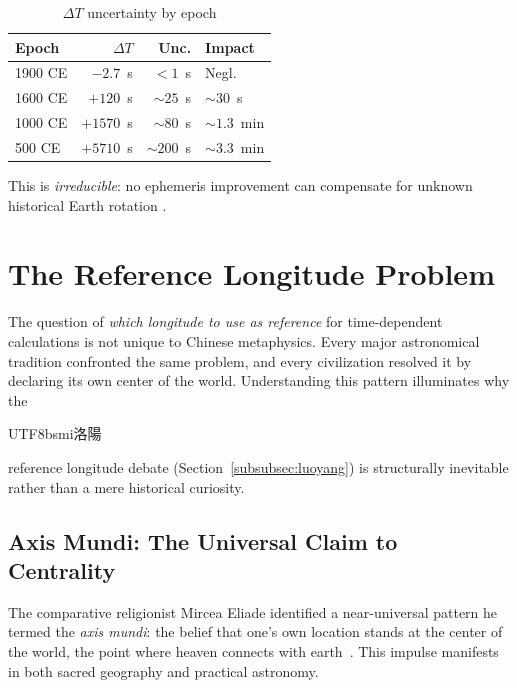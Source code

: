 \documentclass[10pt,a4paper]{article}
\newcommand{\zh}[1]{\begin{CJK}{UTF8}{bsmi}#1\end{CJK}}
\begin{document}
\begin{table}[H]
\centering
\caption{$\Delta T$ uncertainty by epoch}
\label{tab:deltaT}
\footnotesize
\begin{tabular}{lrrl}
\toprule
\textbf{Epoch} & $\Delta T$ & \textbf{Unc.} & \textbf{Impact} \\
\midrule
1900 CE & $-2.7$~s & $<1$~s & Negl. \\
1600 CE & $+120$~s & $\sim 25$~s & $\sim 30$~s \\
1000 CE & $+1570$~s & $\sim 80$~s & $\sim 1.3$~min \\
500 CE & $+5710$~s & $\sim 200$~s & $\sim 3.3$~min \\
\bottomrule
\end{tabular}
\end{table}

This is \emph{irreducible}: no ephemeris improvement can compensate for
unknown historical Earth rotation \cite{stephenson2016}.


\section{The Reference Longitude Problem}
\label{sec:meridians}

The question of \emph{which longitude to use as reference} for time-dependent
calculations is not unique to Chinese metaphysics. Every major astronomical
tradition confronted the same problem, and every civilization resolved it by
declaring its own center of the world. Understanding this pattern illuminates
why the \zh{洛陽} reference longitude debate (Section~\ref{subsubsec:luoyang})
is structurally inevitable rather than a mere historical curiosity.

\subsection{Axis Mundi: The Universal Claim to Centrality}
\label{subsec:axismundi}

The comparative religionist Mircea Eliade identified a near-universal pattern
he termed the \textit{axis mundi}: the belief that one's own location stands
at the center of the world, the point where heaven connects with
earth~\cite{eliade1958}. This impulse manifests in both sacred geography
and practical astronomy.
\end{document}

